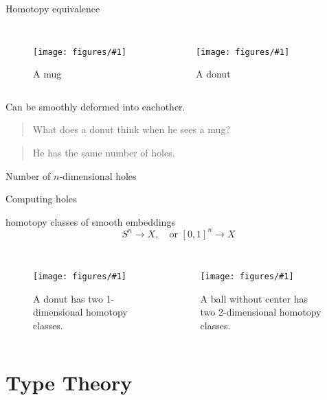 \documentclass[english,handout]{beamer}
\newcommand{\fig}[2]{
    \begin{figure}\begin{center}\texttt{[image: figures/\#1]}\caption{#2\label{#1}}\end{center}
    \end{figure}}
\newcommand{\tcol}[2]{
    \begin{columns}
        \column{.5\textwidth}
        #1
        \column{.5\textwidth}
        #2
    \end{columns}
}
\begin{document}
\begin{frame}{Homotopy equivalence}


\begin{columns}
    \fig{mug}{A mug}
    \fig{donut.jpg}{A donut}
\end{columns}

\begin{definition}
 Can be smoothly deformed into eachother.
\end{definition}
\end{frame}

\begin{frame}{}
 
 \begin{quotation}
 What does a donut think when he sees a mug?
\end{quotation}

\pause

\begin{quotation}
He has the same number of holes.
\end{quotation}



\begin{definition}
 Number of \(n\)-dimensional holes 
 
\end{definition}
 
 
 
\end{frame}



\begin{frame}{Computing holes}

homotopy classes of smooth embeddings \[S^n \rightarrow X, \quad \text{or } {[0,1]}^n \rightarrow X\]

\tcol{
                \fig{loops}{A donut has two 1-dimensional homotopy classes.}
}
    {
                \fig{basketball_hollow}{A ball without center has two 2-dimensional homotopy classes.}
}

\end{frame}


\section{Type Theory}
\end{document}
